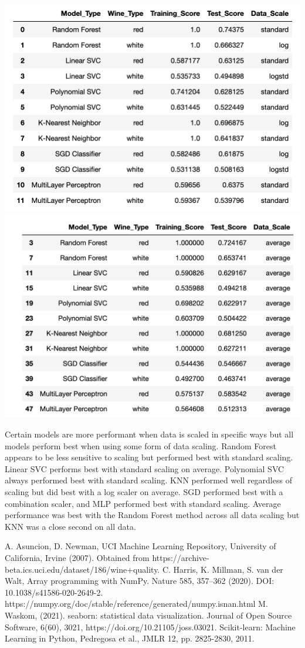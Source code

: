 \documentclass[titlepage]{article}
\begin{document}
\begin{center}
	\includegraphics[width=.4\textwidth]{img/bestscores.png}	\includegraphics[width=.4\textwidth]{img/avescores.png}
\end{center}

Certain models are more performant when data is scaled in specific ways but all models perform best when using some form of data scaling.  Random Forest appears to be less sensitive to scaling but performed best with standard scaling.  Linear SVC performs best with standard scaling on average.  Polynomial SVC always performed best with standard scaling.  KNN performed well regardless of scaling but did best with a log scaler on average.  SGD performed best with a combination scaler, and MLP performed best with standard scaling.  Average performance was best with the Random Forest method across all data scaling but KNN was a close second on all data. 
	
\begin{thebibliography}{9}
	 A. Asuncion, D. Newman, UCI Machine Learning Repository, University of California, Irvine  (2007).  Obtained from https://archive-beta.ics.uci.edu/dataset/186/wine+quality. 
	 C. Harris, K. Millman, S. van der Walt,  Array programming with NumPy. Nature 585, 357–362 (2020). DOI: 10.1038/s41586-020-2649-2.  https://numpy.org/doc/stable/reference/generated/numpy.isnan.html
	 M. Waskom, (2021). seaborn: statistical data visualization. Journal of Open Source Software, 6(60), 3021, https://doi.org/10.21105/joss.03021.
	Scikit-learn: Machine Learning in Python, Pedregosa et al., JMLR 12, pp. 2825-2830, 2011. 
\end{thebibliography}
\end{document}
